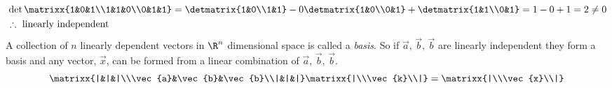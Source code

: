 \begin{align*}
    &\det\matrixx{1&0&1\\1&1&0\\0&1&1}=\detmatrix{1&0\\1&1}-0\detmatrix{1&0\\0&1}+\detmatrix{1&1\\0&1}=1-0+1=2\neq0\\
    &\therefore\text{ linearly independent}
\end{align*}
A collection of $n$ linearly dependent vectors in $\R^n$ dimensional space is called a \textit{basis}. So if $\vec{a},\,\vec{b},\,\vec{b}$ are linearly independent they form a basis and any vector, $\vec{x}$, can be formed from a linear combination of $\vec{a},\,\vec{b},\,\vec{b}$.
$$\matrixx{|&|&|\\\vec{a}&\vec{b}&\vec{b}\\|&|&|}\matrixx{|\\\vec{k}\\|}=\matrixx{|\\\vec{x}\\|}$$


